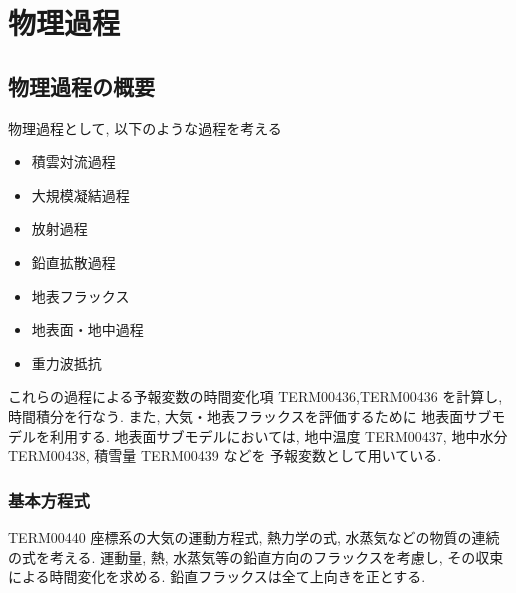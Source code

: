 ﻿
\section{物理過程}

\subsection{物理過程の概要}

物理過程として, 以下のような過程を考える
\begin{itemize}
\item 積雲対流過程
\item 大規模凝結過程
\item 放射過程
\item 鉛直拡散過程
\item 地表フラックス
\item 地表面・地中過程
\item 重力波抵抗
\end{itemize}
これらの過程による予報変数の時間変化項
TERM00436,TERM00436 を計算し, 時間積分を行なう.
また, 大気・地表フラックスを評価するために
地表面サブモデルを利用する.
地表面サブモデルにおいては,
地中温度 TERM00437, 地中水分 TERM00438, 積雪量 TERM00439 などを
予報変数として用いている.


\subsubsection{基本方程式}

TERM00440 座標系の大気の運動方程式, 熱力学の式,
水蒸気などの物質の連続の式を考える.
運動量, 熱, 水蒸気等の鉛直方向のフラックスを考慮し,
その収束による時間変化を求める.
鉛直フラックスは全て上向きを正とする.

